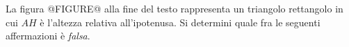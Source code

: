 La 
figura @FIGURE@ alla fine del testo
rappresenta un triangolo rettangolo in cui $AH$ è 
l'altezza relativa all'ipotenusa. Si determini quale fra le seguenti
affermazioni è \emph{falsa}.